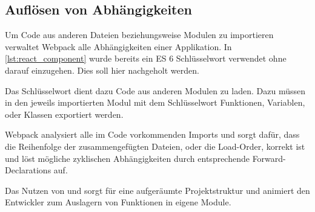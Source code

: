 \subsection{Auflösen von Abhängigkeiten}
\label{sec:gw_aufloesen_von_abhaengigkeiten}

Um Code aus anderen Dateien beziehungsweise Modulen zu importieren verwaltet
Webpack alle Abhängigkeiten einer Applikation.  In \cref{lst:react_component}
wurde bereits ein ES 6 Schlüsselwort verwendet ohne darauf einzugehen.  Dies
soll hier nachgeholt werden.

Das Schlüsselwort  dient dazu Code aus anderen Modulen zu laden.
Dazu müssen in den jeweils importierten Modul mit dem Schlüsselwort
 Funktionen, Variablen, oder Klassen exportiert werden. 

Webpack analysiert alle im Code vorkommenden Imports und sorgt dafür, dass die
Reihenfolge der zusammengefügten Dateien, oder die Load-Order, korrekt ist und
löst mögliche zyklischen Abhängigkeiten durch entsprechende Forward-Declarations
auf.

Das Nutzen von  und  sorgt für eine aufgeräumte
Projektstruktur und animiert den Entwickler zum Auslagern von Funktionen in
eigene Module.
